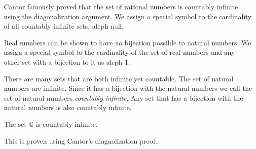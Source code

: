 Cantor famously proved that the set of rational numbers is countably infinite using the diagonalization argument. We assign a special symbol to the cardinality of all countably infinite sets, aleph null.

Real numbers can be shown to have no bijection possible to natural numbers. We assign a special symbol to the cardinality of the set of real numbers and any other set with a bijection to it as aleph 1.  

There are many sets that are both infinite yet countable. The set of natural numbers are infinite. Since it has a bijection with the natural numbers we call the set of natural numbers \textit{countably infinite}. Any set that has a bijection with the natural numbers is also countably infinite. 

\begin {theorem}
The set $\mathbb{Q}$ is countably infinite. 
\end {theorem}
This is proven using Cantor's diagnolization proof.


    
\newpage